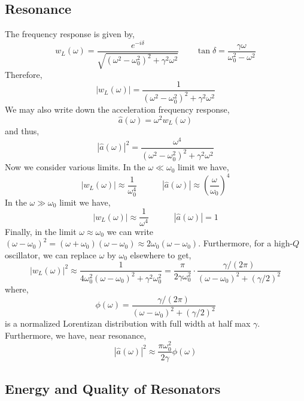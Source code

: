 \documentclass[12pt]{extarticle}
\theoremstyle{definition}
\begin{document}
\subsection{Resonance}

The frequency response is given by,
\[ w_L(\omega) = \frac{e^{-i \delta}}{\sqrt{(\omega^2 - \omega_0^2)^2 + \gamma^2 \omega^2}} \quad \quad \tan{\delta} = \frac{\gamma \omega}{\omega_0^2 - \omega^2} \]
Therefore,
\[ |w_L(\omega)| = \frac{1}{(\omega^2 - \omega_0^2)^2 + \gamma^2 \omega^2} \]
We may also write down the acceleration frequency response,
\[ \hat{a}(\omega) = \omega^2 w_L(\omega) \]
and thus,
\[ |\hat{a}(\omega)|^2 = \frac{\omega^4}{(\omega^2 - \omega_0^2)^2 + \gamma^2 \omega^2} \]
Now we consider various limits. In the $\omega \ll \omega_0$ limit we have,
\[ |w_L(\omega)| \approx \frac{1}{\omega_0^4} \quad \quad \quad |\hat{a}(\omega)| \approx \left( \frac{\omega}{\omega_0} \right)^4 \]
In the $\omega \gg \omega_0$ limit we have,
\[ |w_L(\omega) | \approx \frac{1}{\omega^4} \quad \quad \quad |\hat{a}(\omega)| = 1 \]
Finally, in the limit $\omega \approx \omega_0$ we can write $(\omega - \omega_0)^2 = (\omega + \omega_0) (\omega - \omega_0) \approx 2 \omega_0 (\omega - \omega_0)$. Furthermore, for a high-$Q$ oscillator, we can replace $\omega$ by $\omega_0$ elsewhere to get,
\[ |w_L(\omega)|^2 \approx \frac{1}{4 \omega_0^2 (\omega - \omega_0)^2 + \gamma^2 \omega_0^2} = \frac{\pi}{2 \gamma \omega_0^2} \cdot \frac{\gamma / (2 \pi)}{(\omega - \omega_0)^2 + \left( \gamma / 2 \right)^2} \]
where,
\[ \phi(\omega) = \frac{\gamma / (2 \pi)}{(\omega - \omega_0)^2 + \left( \gamma / 2 \right)^2} \]
is a normalized Lorentizan distribution with full width at half max $\gamma$. Furthermore, we have, near resonance,
\[ | \hat{a}(\omega) |^2 \approx \frac{\pi \omega_0^2}{2 \gamma} \phi(\omega) \] 


\subsection{Energy and Quality of Resonators}

\newcommand{\EV}[1]{\left< #1 \right>}
\end{document}

